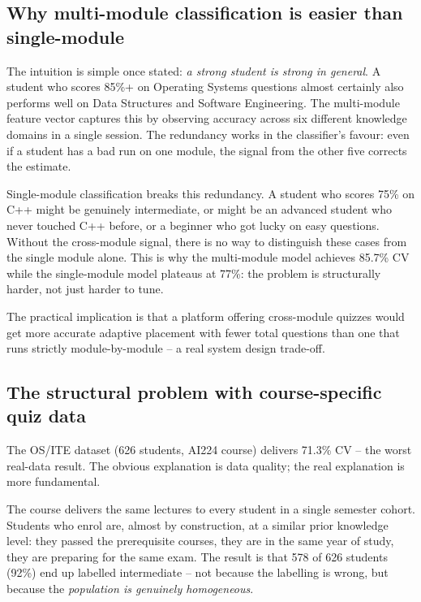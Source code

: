 \documentclass[12pt,a4paper]{article}
\begin{document}
\subsection{Why multi-module classification is easier than single-module}

The intuition is simple once stated: \emph{a strong student is strong in general}.
A student who scores 85\%+ on Operating Systems questions almost certainly also
performs well on Data Structures and Software Engineering. The multi-module feature
vector captures this by observing accuracy across six different knowledge domains in
a single session. The redundancy works in the classifier's favour: even if a student
has a bad run on one module, the signal from the other five corrects the estimate.

Single-module classification breaks this redundancy. A student who scores 75\% on
C++ might be genuinely intermediate, or might be an advanced student who never
touched C++ before, or a beginner who got lucky on easy questions. Without the
cross-module signal, there is no way to distinguish these cases from the single module
alone. This is why the multi-module model achieves 85.7\% CV while the single-module
model plateaus at 77\%: the problem is structurally harder, not just harder to tune.

The practical implication is that a platform offering cross-module quizzes would
get more accurate adaptive placement with fewer total questions than one that runs
strictly module-by-module -- a real system design trade-off.

\subsection{The structural problem with course-specific quiz data}

The OS/ITE dataset (626 students, AI224 course) delivers 71.3\% CV -- the worst
real-data result. The obvious explanation is data quality; the real explanation
is more fundamental.

The course delivers the same lectures to every student in a single semester cohort.
Students who enrol are, almost by construction, at a similar prior knowledge level:
they passed the prerequisite courses, they are in the same year of study, they are
preparing for the same exam. The result is that 578 of 626 students (92\%) end up
labelled intermediate -- not because the labelling is wrong, but because the
\emph{population is genuinely homogeneous}.
\end{document}
